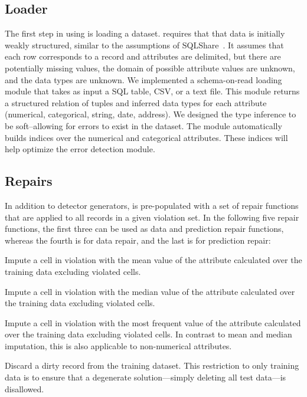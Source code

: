     \subsection{Loader}
    The first step in using \sys is loading a dataset. \sys requires that that data is initially weakly structured, similar to the assumptions of SQLShare~\cite{howe2013sqlshare}. It assumes that each row corresponds to a record and attributes are delimited, but there are potentially missing values, the domain of possible attribute values are unknown, and the data types are unknown.
    We implemented a schema-on-read loading module that takes as input a SQL table, CSV, or a text file.
    This module returns a structured relation of tuples and inferred data types for each attribute (numerical, categorical, string, date, address).
    We designed the type inference to be soft--allowing for errors to exist in the dataset.
    The module automatically builds indices over the numerical and categorical attributes.
    These indices will help optimize the error detection module.
\fi



\subsection{Repairs}
In addition to detector generators, \sys is pre-populated with a set of repair functions that are applied to all records in a given violation set.  In the following five repair functions, the first three can be used as data and prediction repair functions,  whereas the fourth is for data repair, and the last is for prediction repair:

 Impute a cell in violation with the mean value of the attribute calculated over the training data excluding violated cells.


 Impute a cell in violation with the median value of the attribute calculated over the training data excluding violated cells.

 Impute a cell in violation with the most frequent value of the attribute calculated over the training data excluding violated cells.  In contrast to mean and median imputation, this is also applicable to non-numerical attributes.

 Discard a dirty record from the training dataset.  This restriction to only training data is to ensure that a degenerate solution---simply deleting all test data---is disallowed. 

